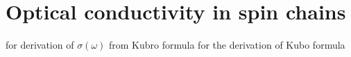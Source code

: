 \chapter{Optical conductivity in spin chains\label{app:opt_cond}}
\thispagestyle{chapterBeginStyle}

\textcite{Sirker2011,Sirker2020} for derivation of \(\sigma(\omega)\) from Kubro formula
\textcite{Gohmann2022} for the derivation of Kubo formula
